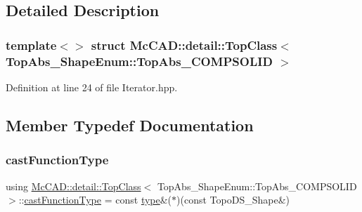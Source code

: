 \subsection{Detailed Description}
\subsubsection*{template$<$$>$\newline
struct Mc\+C\+A\+D\+::detail\+::\+Top\+Class$<$ Top\+Abs\+\_\+\+Shape\+Enum\+::\+Top\+Abs\+\_\+\+C\+O\+M\+P\+S\+O\+L\+I\+D $>$}



Definition at line 24 of file Iterator.\+hpp.



\subsection{Member Typedef Documentation}
\mbox{\label{structMcCAD_1_1detail_1_1TopClass_3_01TopAbs__ShapeEnum_1_1TopAbs__COMPSOLID_01_4_a110312d2c20be779990d50a4ca68b71f}} 
\subsubsection{\texorpdfstring{cast\+Function\+Type}{castFunctionType}}
{\footnotesize\ttfamily using \hyperlink{structMcCAD_1_1detail_1_1TopClass}{Mc\+C\+A\+D\+::detail\+::\+Top\+Class}$<$ Top\+Abs\+\_\+\+Shape\+Enum\+::\+Top\+Abs\+\_\+\+C\+O\+M\+P\+S\+O\+L\+ID $>$\+::\hyperlink{structMcCAD_1_1detail_1_1TopClass_3_01TopAbs__ShapeEnum_1_1TopAbs__COMPSOLID_01_4_a110312d2c20be779990d50a4ca68b71f}{cast\+Function\+Type} =  const \hyperlink{structMcCAD_1_1detail_1_1TopClass_3_01TopAbs__ShapeEnum_1_1TopAbs__COMPSOLID_01_4_a9255dacb2f0f62babf1ac9439492e20b}{type}\&($\ast$)(const Topo\+D\+S\+\_\+\+Shape\&)}



